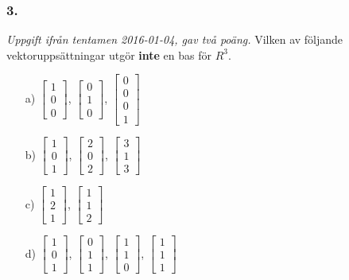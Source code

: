 \documentclass{article}
\begin{document}
\subsubsection*{3.}
\textit{Uppgift ifrån tentamen 2016-01-04, gav två poäng.}
Vilken av följande vektoruppsättningar utgör \textbf{inte} en bas för $R^3$.
\begin{itemize}
	\item[a) ] $ \begin{bmatrix} 1 \\ 0 \\ 0 \end{bmatrix}$, $\begin{bmatrix} 0 \\ 1 \\ 0 \end{bmatrix}$, $\begin{bmatrix} 0 \\ 0 \\ 0 \\ 1 \end{bmatrix}$
	\item[b) ] $ \begin{bmatrix} 1 \\ 0 \\ 1 \end{bmatrix}$, $\begin{bmatrix} 2 \\ 0 \\ 2 \end{bmatrix}$, $\begin{bmatrix} 3 \\ 1 \\ 3 \end{bmatrix}$
	\item[c) ] $ \begin{bmatrix} 1 \\ 2 \\ 1 \end{bmatrix}$, $\begin{bmatrix} 1 \\ 1 \\ 2 \end{bmatrix}$
	\item[d) ] $ \begin{bmatrix} 1 \\ 0 \\ 1 \end{bmatrix}$, $\begin{bmatrix} 0 \\ 1 \\ 1 \end{bmatrix}$, $\begin{bmatrix} 1 \\ 1 \\ 0 \end{bmatrix}$, $\begin{bmatrix} 1 \\ 1 \\ 1 \end{bmatrix}$

\end{itemize}
\end{document}
